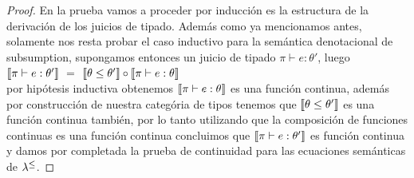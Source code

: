 \begin{proof}

En la prueba vamos a proceder por inducci\'on es la estructura de la derivaci\'on 
de los juicios de tipado. Adem\'as como ya mencionamos antes, solamente nos resta
probar el caso inductivo para la sem\'antica denotacional de subsumption, supongamos
entonces un juicio de tipado $\pi \vdash e : \theta'$, luego\\

$\llbracket \pi \vdash e : \theta' \rrbracket$ $=$ $\llbracket \theta \leq \theta' \rrbracket \circ \llbracket \pi \vdash e : \theta \rrbracket$\\

por hip\'otesis inductiva obtenemos $\llbracket \pi \vdash e : \theta \rrbracket$ es una funci\'on
continua, adem\'as por construcci\'on de nuestra categ\'oria de tipos
tenemos que $\llbracket \theta \leq \theta' \rrbracket$ es una funci\'on continua tambi\'en, 
por lo tanto utilizando que la composici\'on de funciones continuas es una funci\'on
continua concluimos que $\llbracket \pi \vdash e : \theta' \rrbracket$ es funci\'on continua y
damos por completada la prueba de continuidad para las ecuaciones sem\'anticas
de $\lambda^{\leq}$.

\end{proof}

